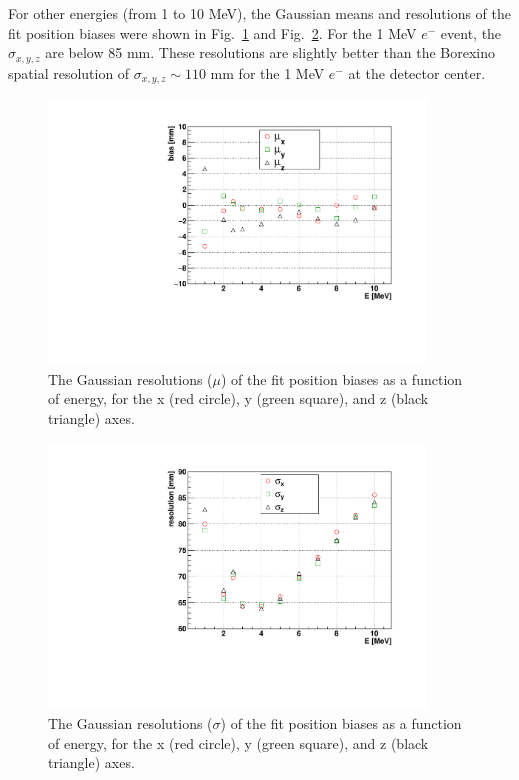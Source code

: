 For other energies (from 1 to 10 MeV), the Gaussian means and resolutions of the fit position biases were shown in Fig.~\ref{fig:scintBiasVsE} and Fig.~\ref{fig:scintResolVsE}. For the 1 MeV $e^-$ event, the $\sigma_{x,y,z}$ are below 85 mm. These resolutions are slightly better than the Borexino spatial resolution of $\sigma_{x,y,z}\sim110$ mm for the 1 MeV $e^-$ at the detector center\cite{borexino2020experimental}.

\begin{figure}[!htb]
	\centering
	\includegraphics[width=10cm]{fullScintBiasVsE.pdf}
	\caption[The Gaussian biases ($\mu$) of the \texttt{MP scint fitter} fit position biases as a function of energy, for the x, y, and z axes.]{The Gaussian resolutions ($\mu$) of the fit position biases as a function of energy, for the x (red circle), y (green square), and z (black triangle) axes.}
	\label{fig:scintBiasVsE}
\end{figure}

\begin{figure}[!htb]
	\centering
	\includegraphics[width=10cm]{fullScintResolVsE.pdf}
	\caption[The Gaussian resolutions ($\sigma$) of the \texttt{MP scint fitter} fit position biases as a function of energy, for the x, y, and z axes.]{The Gaussian resolutions ($\sigma$) of the fit position biases as a function of energy, for the x (red circle), y (green square), and z (black triangle) axes.}
	\label{fig:scintResolVsE}
\end{figure}


